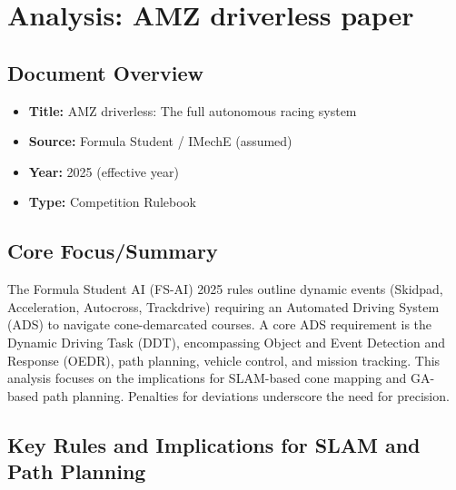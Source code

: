 \section{Analysis: AMZ driverless paper}\label{sec:amz-racing}

\subsection{Document Overview}\label{subsec:document-overview}
\begin{itemize}
    \item \textbf{Title:} AMZ driverless: The full autonomous racing system
    \item \textbf{Source:} Formula Student / IMechE (assumed)
    \item \textbf{Year:} 2025 (effective year)
    \item \textbf{Type:} Competition Rulebook
\end{itemize}

\subsection{Core Focus/Summary}\label{subsec:core-focus/summary}
The Formula Student AI (FS-AI) 2025 rules outline dynamic events (Skidpad, Acceleration, Autocross, Trackdrive) requiring an Automated Driving System (ADS) to navigate cone-demarcated courses.
A core ADS requirement is the Dynamic Driving Task (DDT), encompassing Object and Event Detection and Response (OEDR), path planning, vehicle control, and mission tracking.
This analysis focuses on the implications for SLAM-based cone mapping and GA-based path planning.
Penalties for deviations underscore the need for precision.

\subsection{Key Rules and Implications for SLAM and Path Planning}\label{subsec:key-rules-and-implications-for-slam-and-path-planning}

